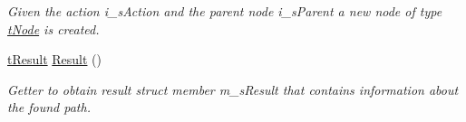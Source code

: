 \begin{DoxyCompactItemize}
\begin{DoxyCompactList}\small\item\em Given the action i\+\_\+s\+Action and the parent node i\+\_\+s\+Parent a new node of type \mbox{\hyperlink{structplanner_1_1t_node}{t\+Node}} is created. \end{DoxyCompactList}\item 
\mbox{\label{classplanner_1_1c_planner_interface_af7a88d017115e9bfee25c12091062641}} 
\mbox{\hyperlink{structt_result}{t\+Result}} \mbox{\hyperlink{classplanner_1_1c_planner_interface_af7a88d017115e9bfee25c12091062641}{Result}} ()
\begin{DoxyCompactList}\small\item\em Getter to obtain result struct member m\+\_\+s\+Result that contains information about the found path. \end{DoxyCompactList}\end{DoxyCompactItemize}
